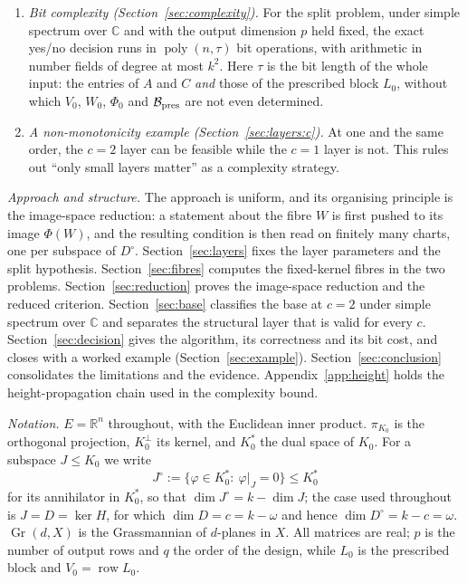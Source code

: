 \documentclass[journal]{IEEEtran}
\theoremstyle{plainn}
\theoremstyle{remark}
\newcommand{\row}{\operatorname{row}}
\newcommand{\Gr}{\operatorname{Gr}}
\newcommand{\poly}{\operatorname{poly}}
\begin{document}
\begin{enumerate}[label=\arabic*.,leftmargin=*,itemsep=1pt,topsep=2pt]
explicitly. The image space has at most one projective-line component, and on a chart every real point is
admissible, so the generic-gcd criterion is sharp in both directions and the algorithm is an exact yes/no
decision procedure.
\item \emph{Bit complexity (Section~\ref{sec:complexity}).} For the split problem, under simple spectrum
over $\mathbb C$ and with the output dimension $p$ held fixed, the exact yes/no decision runs in
$\poly(n,\tau)$ bit operations, with arithmetic in number fields of degree at most $k^2$. Here $\tau$ is
the bit length of the whole input: the entries of $A$ and $C$ \emph{and} those of the prescribed block
$L_0$, without which $V_0$, $W_0$, $\Phi_0$ and $\mathcal B_{\rm pres}$ are not even determined.
\item \emph{A non-monotonicity example (Section~\ref{sec:layers:c}).} At one and the same order, the
$c=2$ layer can be feasible while the $c=1$ layer is not. This rules out ``only small layers matter'' as
a complexity strategy.
\end{enumerate}

\emph{Approach and structure.} The approach is uniform, and its organising principle is the image-space
reduction: a statement about the fibre $W$ is first pushed to its image $\Phi(W)$, and the resulting
condition is then read on finitely many charts, one per subspace of $D^\circ$. Section~\ref{sec:layers}
fixes the layer parameters and the split hypothesis.
Section~\ref{sec:fibres} computes the fixed-kernel fibres in the two problems.
Section~\ref{sec:reduction} proves the image-space reduction and the reduced criterion.
Section~\ref{sec:base} classifies the base at $c=2$ under simple spectrum over $\mathbb C$ and separates
the structural layer that is valid for every $c$.
Section~\ref{sec:decision} gives the algorithm, its correctness and its bit cost, and closes with a
worked example (Section~\ref{sec:example}).
Section~\ref{sec:conclusion} consolidates the limitations and the evidence.
Appendix~\ref{app:height} holds the height-propagation chain used in the complexity bound.

\emph{Notation.} $E=\mathbb R^n$ throughout, with the Euclidean inner product. $\pi_{K_0}$ is the
orthogonal projection, $K_0^\perp$ its kernel, and $K_0^*$ the dual space of $K_0$. For a subspace
$J\le K_0$ we write
\[
J^\circ:=\{\varphi\in K_0^*:\ \varphi|_J=0\}\le K_0^*
\]
for its annihilator in $K_0^*$, so that $\dim J^\circ=k-\dim J$; the case used
throughout is $J=D=\ker H$, for which $\dim D=c=k-\omega$ and hence $\dim D^\circ=k-c=\omega$. $\Gr(d,X)$ is the
Grassmannian of $d$-planes in $X$. All matrices are real; $p$ is the number of output rows and $q$ the
order of the design, while $L_0$ is the prescribed block and $V_0=\row L_0$.
\end{document}
